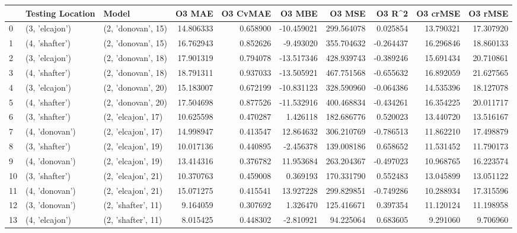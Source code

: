 \begin{tabular}{lllrrrrrrr}
\toprule
{} & Testing Location &               Model &     O3 MAE &  O3 CvMAE &     O3 MBE &      O3 MSE &    O3 R\textasciicircum2 &   O3 crMSE &    O3 rMSE \\
\midrule
0  &   (3, 'elcajon') &  (2, 'donovan', 15) &  14.806333 &  0.658900 & -10.459021 &  299.564078 &  0.025854 &  13.790321 &  17.307920 \\
1  &   (4, 'shafter') &  (2, 'donovan', 15) &  16.762943 &  0.852626 &  -9.493020 &  355.704632 & -0.264437 &  16.296846 &  18.860133 \\
2  &   (3, 'elcajon') &  (2, 'donovan', 18) &  17.901319 &  0.794078 & -13.517346 &  428.939743 & -0.389246 &  15.691434 &  20.710861 \\
3  &   (4, 'shafter') &  (2, 'donovan', 18) &  18.791311 &  0.937033 & -13.505921 &  467.751568 & -0.655632 &  16.892059 &  21.627565 \\
4  &   (3, 'elcajon') &  (2, 'donovan', 20) &  15.183007 &  0.672199 & -10.831123 &  328.590960 & -0.064386 &  14.535396 &  18.127078 \\
5  &   (4, 'shafter') &  (2, 'donovan', 20) &  17.504698 &  0.877526 & -11.532916 &  400.468834 & -0.434261 &  16.354225 &  20.011717 \\
6  &   (3, 'shafter') &  (2, 'elcajon', 17) &  10.625598 &  0.470287 &   1.426118 &  182.686776 &  0.520023 &  13.440720 &  13.516167 \\
7  &   (4, 'donovan') &  (2, 'elcajon', 17) &  14.998947 &  0.413547 &  12.864632 &  306.210769 & -0.786513 &  11.862210 &  17.498879 \\
8  &   (3, 'shafter') &  (2, 'elcajon', 19) &  10.017136 &  0.440895 &  -2.456378 &  139.008186 &  0.658652 &  11.531452 &  11.790173 \\
9  &   (4, 'donovan') &  (2, 'elcajon', 19) &  13.414316 &  0.376782 &  11.953684 &  263.204367 & -0.497023 &  10.968765 &  16.223574 \\
10 &   (3, 'shafter') &  (2, 'elcajon', 21) &  10.370763 &  0.459008 &   0.369193 &  170.331790 &  0.552483 &  13.045899 &  13.051122 \\
11 &   (4, 'donovan') &  (2, 'elcajon', 21) &  15.071275 &  0.415541 &  13.927228 &  299.829851 & -0.749286 &  10.288934 &  17.315596 \\
12 &   (3, 'donovan') &  (2, 'shafter', 11) &   9.164059 &  0.307692 &   1.326470 &  125.416671 &  0.397354 &  11.120124 &  11.198958 \\
13 &   (4, 'elcajon') &  (2, 'shafter', 11) &   8.015425 &  0.448302 &  -2.810921 &   94.225064 &  0.683605 &   9.291060 &   9.706960 \\

\end{tabular}
